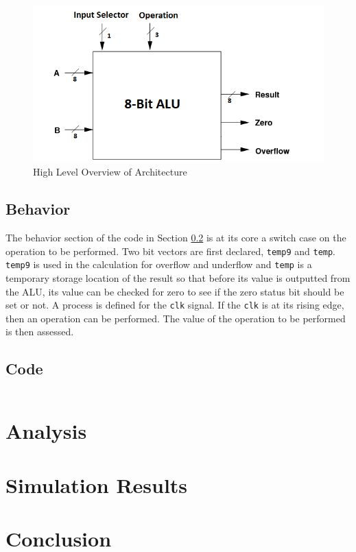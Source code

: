 \documentclass[12pt]{article}
\begin{document}
\begin{figure}[H]
\centering
\includegraphics[width=0.7\linewidth]{high-level-overview}
\caption{High Level Overview of Architecture}
\label{fig:high-level-overview}
\end{figure}

\subsection{Behavior}
The behavior section of the code in Section \ref{sec:code} is at its core a switch case on the operation to be performed. Two bit vectors are first declared, \texttt{temp9} and \texttt{temp}. \texttt{temp9} is used in the calculation for overflow and underflow and \texttt{temp} is a temporary storage location of the result so that before its value is outputted from the ALU, its value can be checked for zero to see if the zero status bit should be set or not. A process is defined for the \texttt{clk} signal. If the \texttt{clk} is at its rising edge, then an operation can be performed. The value of the operation to be performed is then assessed. 

\begin{table}[H]
	\begin{tabular}
		
	\end{tabular}
\end{table}

\subsection{Code}\label{sec:code}
\lstset{language=VHDL}

\begin{lstlisting}

\end{lstlisting}

\section{Analysis}

\section{Simulation Results}



\section{Conclusion}
\end{document}
